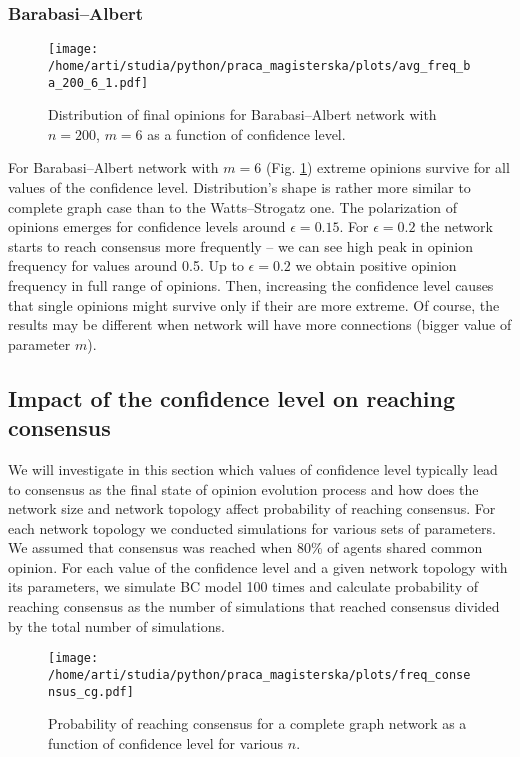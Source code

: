 \documentclass[a4paper, 12pt]{article}
\begin{document}
\subsubsection{Barabasi--Albert}

\begin{figure}[H]
		\centering
		\texttt{[image: /home/arti/studia/python/praca\_magisterska/plots/avg\_freq\_ba\_200\_6\_1.pdf]}
		\caption{Distribution of final opinions for Barabasi--Albert network with $n=200$, $m=6$ as a function of confidence level.}
		\label{f7}
\end{figure}

For Barabasi--Albert network with $m=6$ (Fig. \ref{f7}) extreme opinions survive for all values of the confidence level. Distribution's shape is rather more similar to complete graph case than to the Watts--Strogatz one. The polarization of opinions emerges for confidence levels around $\epsilon=0.15$. For $\epsilon=0.2$ the network starts to reach consensus more frequently -- we can see high peak in opinion frequency for values around 0.5. Up to $\epsilon=0.2$ we obtain positive opinion frequency in full range of opinions. Then, increasing the confidence level causes that single opinions might survive only if their are more extreme. Of course, the results may be different when network will have more connections (bigger value of parameter $m$). 

\subsection{Impact of the confidence level on reaching consensus}
We will investigate in this section which values of confidence level typically lead to consensus as the final state of opinion evolution process and how does the network size and network topology affect probability of reaching consensus. For each network topology we conducted simulations for various sets of parameters. We assumed that consensus was reached when 80\% of agents shared common opinion. For each value of the confidence level and a given network topology with its parameters, we simulate BC model 100 times and calculate probability of reaching consensus as the number of simulations that reached consensus divided by the total number of simulations. 

\begin{figure}[H]
		\centering
		\texttt{[image: /home/arti/studia/python/praca\_magisterska/plots/freq\_consensus\_cg.pdf]}
		\caption{Probability of reaching consensus for a complete graph network as a function of confidence level for various $n$.}
		\label{freq_cg}
\end{figure}
\end{document}
